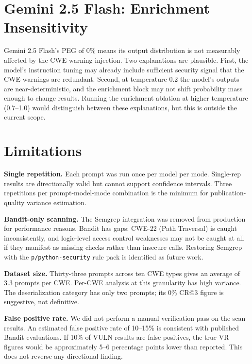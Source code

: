 \documentclass[12pt,a4paper]{report}
\begin{document}
\section{Gemini 2.5 Flash: Enrichment Insensitivity}
\label{sec:discgemini}

Gemini 2.5 Flash's PEG of 0\% means its output distribution is not measurably
affected by the CWE warning injection. Two explanations are plausible. First, the
model's instruction tuning may already include sufficient security signal that the
CWE warnings are redundant. Second, at temperature 0.2 the model's outputs are
near-deterministic, and the enrichment block may not shift probability mass enough
to change results. Running the enrichment ablation at higher temperature (0.7--1.0)
would distinguish between these explanations, but this is outside the current scope.

\section{Limitations}
\label{sec:limitations}

\textbf{Single repetition.} Each prompt was run once per model per mode. Single-rep
results are directionally valid but cannot support confidence intervals. Three
repetitions per prompt-model-mode combination is the minimum for publication-quality
variance estimation.

\textbf{Bandit-only scanning.} The Semgrep integration was removed from production
for performance reasons. Bandit has gaps: CWE-22 (Path Traversal) is caught
inconsistently, and logic-level access control weaknesses may not be caught at all
if they manifest as missing checks rather than insecure calls. Restoring Semgrep
with the \texttt{p/python-security} rule pack is identified as future work.

\textbf{Dataset size.} Thirty-three prompts across ten CWE types gives an average
of 3.3 prompts per CWE. Per-CWE analysis at this granularity has high variance.
The deserialization category has only two prompts; its 0\% CR@3 figure is
suggestive, not definitive.

\textbf{False positive rate.} We did not perform a manual verification pass on the
scan results. An estimated false positive rate of 10--15\% is consistent with
published Bandit evaluations. If 10\% of VULN results are false positives, the
true VR figures would be approximately 5--6 percentage points lower than reported.
This does not reverse any directional finding.
\end{document}
